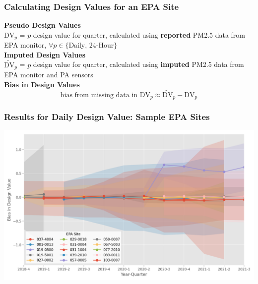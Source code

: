 \documentclass{beamer}
\begin{document}
\begin{frame}
\frametitle{Calculating Design Values for an EPA Site}

\def\dvp{\text{DV}_p}
\def\dvpp{\widetilde{\text{DV}}_p}

\textbf{Pseudo Design Values}\\[0.5em]
$\dvp$ = $p$ design value for quarter, calculated using \textbf{reported} PM2.5 data from EPA monitor, $\forall p \in \{\text{Daily, 24-Hour}\}$
\\[1em]

\textbf{Imputed Design Values}\\[0.5em]
$\dvpp$ = $p$ design value for quarter, calculated using \textbf{imputed} PM2.5 data from EPA monitor and PA sensors
\\[2em]
\textbf{Bias in Design Values}
\begin{equation*}
    \text{bias from missing data in }\dvp \approx \dvpp - \dvp
\end{equation*}

\end{frame}


\begin{frame}
\frametitle{Results for Daily Design Value: Sample EPA Sites}
\includegraphics[width=\textwidth]{output/figures/final_results/DV_plot_all_test_sites.png}
\end{frame}
\end{document}
